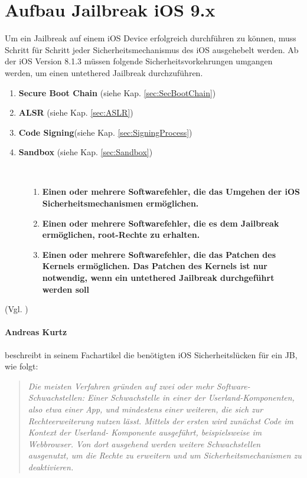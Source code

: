 \section{Aufbau Jailbreak iOS 9.x}
\label{sec:JBAufbau}
Um ein Jailbreak auf einem iOS Device erfolgreich durchführen zu können, muss Schritt für Schritt jeder Sicherheitsmechanismus des iOS ausgehebelt werden. Ab der iOS Version 8.1.3 müssen folgende Sicherheitsvorkehrungen umgangen werden, um einen untethered Jailbreak durchzuführen.

\begin{enumerate}
	    \item \textbf{Secure Boot Chain} (siehe Kap. \ref{sec:SecBootChain})
	    \item \textbf{ALSR }(siehe Kap. \ref{sec:ASLR}) 
	    \item \textbf{Code Signing}(siehe Kap. \ref{sec:SigningProcess}) 	   
	    \item \textbf{Sandbox} (siehe Kap. \ref{sec:Sandbox}) 
\end{enumerate}

\begin{description}
    \item[\parbox{\textwidth} {Damit die Sicherheitsmechanismen überhaupt umgangen werden können, müssen verschiedene Programmierfehler im iOS gefunden werden. }]~\par
  \begin{enumerate}
  \item \textbf{Einen oder mehrere Softwarefehler, die das Umgehen der iOS Sicherheitsmechanismen ermöglichen.}
  \item \textbf{Einen oder mehrere Softwarefehler, die es dem Jailbreak ermöglichen, root-Rechte zu erhalten.}
  \item \textbf{Einen oder mehrere Softwarefehler, die das Patchen des Kernels ermöglichen. Das Patchen des Kernels ist nur notwendig, wenn ein untethered Jailbreak durchgeführt werden soll}
\end{enumerate}\end{description} 
(Vgl. \cite{TaiG[1], TaiG[2], TaiG[3]})

\paragraph{Andreas Kurtz} beschreibt in seinem Fachartikel die benötigten iOS Sicherheitslücken für ein JB, wie folgt: 
\begin{quote}
\textit{\glqq Die meisten Verfahren gründen auf zwei oder mehr Software-Schwachstellen: Einer Schwachstelle in einer der Userland-Komponenten, also etwa einer App, und mindestens einer weiteren, die sich zur Rechteerweiterung nutzen lässt. Mittels der ersten wird zunächst Code im Kontext der Userland- Komponente ausgeführt, beispielsweise im Webbrowser. Von dort ausgehend werden weitere Schwachstellen ausgenutzt, um die Rechte zu erweitern und um Sicherheitsmechanismen zu deaktivieren.\grqq{}} \cite{JB[2]} 
\end{quote}


